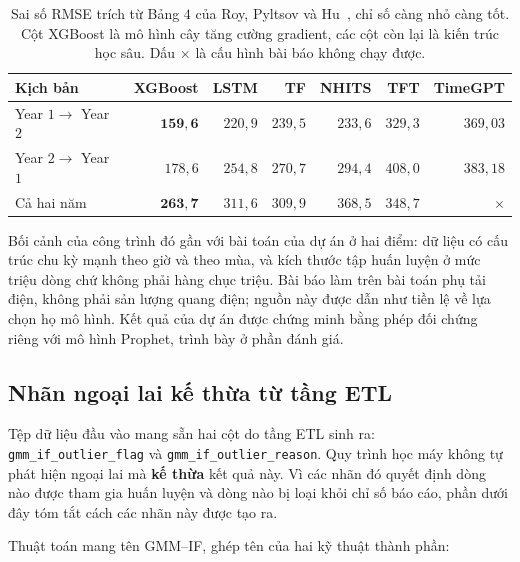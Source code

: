 \documentclass[12pt, a4paper]{report}
\begin{document}
\begin{table}[htbp]
\centering

\small
\begin{tabular}{@{}l r r r r r r@{}}
\toprule
\textbf{Kịch bản} & \textbf{XGBoost} & \textbf{LSTM} & \textbf{TF} & \textbf{NHITS} &
\textbf{TFT} & \textbf{TimeGPT} \\
\midrule
Year $1 \rightarrow$ Year $2$ & $\mathbf{159{,}6}$ & $220{,}9$ & $239{,}5$ & $233{,}6$ & $329{,}3$ & $369{,}03$ \\
Year $2 \rightarrow$ Year $1$ & $178{,}6$ & $254{,}8$ & $270{,}7$ & $294{,}4$ & $408{,}0$ & $383{,}18$ \\
Cả hai năm                    & $\mathbf{263{,}7}$ & $311{,}6$ & $309{,}9$ & $368{,}5$ & $348{,}7$ & $\times$ \\
\bottomrule
\end{tabular}
\caption[Sai số RMSE trích từ Bảng $4$ của Roy, Pyltsov và Hu, chỉ số càng nhỏ càng tốt]{Sai số RMSE trích từ Bảng $4$ của Roy, Pyltsov và Hu~\cite{roy2025hourly}, chỉ số
càng nhỏ càng tốt. Cột XGBoost là mô hình cây tăng cường gradient, các cột còn lại là kiến
trúc học sâu. Dấu $\times$ là cấu hình bài báo không chạy được.}
\label{tab:roy_rmse}
\end{table}


Bối cảnh của công trình đó gần với bài toán của dự án ở hai điểm: dữ liệu có cấu trúc
chu kỳ mạnh theo giờ và theo mùa, và kích thước tập huấn luyện ở mức triệu dòng chứ không
phải hàng chục triệu. Bài báo
làm trên bài toán phụ tải điện, không phải sản lượng quang điện; nguồn này được dẫn
như tiền lệ về lựa chọn họ mô hình. Kết quả của dự án được
chứng minh bằng phép đối chứng riêng với mô hình Prophet, trình bày ở phần đánh giá.

\FloatBarrier
\subsection{Nhãn ngoại lai kế thừa từ tầng ETL}

Tệp dữ liệu đầu vào mang sẵn hai cột do tầng ETL sinh ra:
\texttt{gmm\_if\_outlier\_flag} và \texttt{gmm\_if\_outlier\_reason}. Quy trình học máy không tự
phát hiện ngoại lai mà \textbf{kế thừa} kết quả này. Vì các nhãn đó quyết định dòng
nào được tham gia huấn luyện và dòng nào bị loại khỏi chỉ số báo cáo, phần dưới đây tóm
tắt cách các nhãn này được tạo ra.

Thuật toán mang tên GMM--IF, ghép tên của hai kỹ thuật thành phần:
\end{document}

